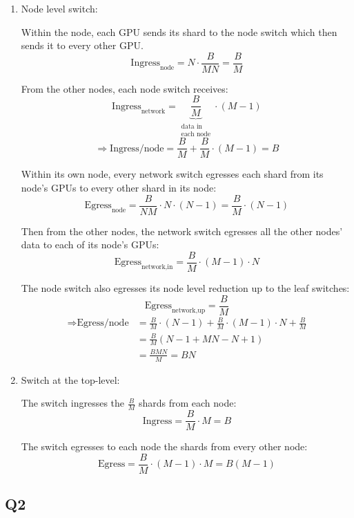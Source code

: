 \documentclass[11pt]{article}
\begin{document}
\begin{enumerate}[label=(\roman*)]
    \item Node level switch:

    Within the node, each GPU sends its shard to the node switch which then sends it to every other GPU.
    \[
    \text{Ingress}_{\text{node}} = N \cdot \frac{B}{MN} = \frac{B}{M}
    \]

    From the other nodes, each node switch receives:
    \[
    \text{Ingress}_{\text{network}} = \underbrace{\frac{B}{M}}_{\substack{\text{data in}\\ \text{each node}}} \cdot (M-1)
    \]
    \[
    \Rightarrow \text{Ingress/node} = \frac{B}{M} + \frac{B}{M} \cdot (M-1) = B
    \]

    Within its own node, every network switch egresses each shard from its node's GPUs to every other shard in its node:
    \[
    \text{Egress}_{\text{node}} = \frac{B}{NM} \cdot N \cdot (N-1) = \frac{B}{M} \cdot (N-1)
    \]

    Then from the other nodes, the network switch egresses all the other nodes' data to each of its node's GPUs:
    \[
    \text{Egress}_{\text{network,in}} = \frac{B}{M} \cdot (M-1) \cdot N
    \]

    The node switch also egresses its node level reduction up to the leaf switches:
    \[
    \text{Egress}_{\text{network,up}} = \frac{B}{M}
    \]
    \begin{align*}
    \Rightarrow \text{Egress/node} &= \frac{B}{M} \cdot (N-1) + \frac{B}{M} \cdot (M-1) \cdot N + \frac{B}{M} \\
    &= \frac{B}{M}\left(N - 1 + MN - N + 1\right) \\
    &= \frac{BMN}{M} = BN
    \end{align*}

    \item Switch at the top-level:

    The switch ingresses the $\frac{B}{M}$ shards from each node:
    \[
    \text{Ingress} = \frac{B}{M} \cdot M = B
    \]

    The switch egresses to each node the shards from every other node:
    \[
    \text{Egress} = \frac{B}{M} \cdot (M-1) \cdot M = B(M-1)
    \]
\end{enumerate}

\subsection*{Q2}
\end{document}
